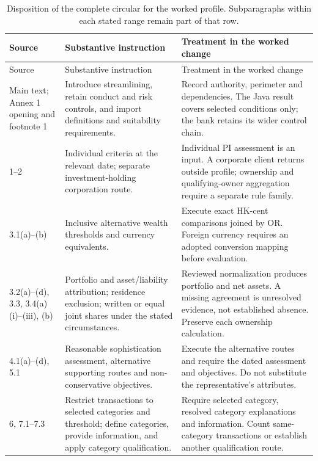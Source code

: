 
\begingroup\small
\begin{longtable}{P{0.14\textwidth}P{0.37\textwidth}P{0.39\textwidth}}
\caption{Disposition of the complete circular for the worked profile. Subparagraphs
within each stated range remain part of that row.}\label{tab:circular-inventory}\\
\toprule Source & Substantive instruction & Treatment in the worked change \\\midrule
\endfirsthead
\toprule Source & Substantive instruction & Treatment in the worked change \\\midrule
\endhead
Main text; Annex 1 opening and footnote 1 & Introduce streamlining, retain conduct and risk controls, and import definitions and suitability requirements. & Record authority, perimeter and dependencies. The Java result covers selected conditions only; the bank retains its wider control chain.\\
1--2 & Individual criteria at the relevant date; separate investment-holding corporation route. & Individual PI assessment is an input. A corporate client returns outside profile; ownership and qualifying-owner aggregation require a separate rule family.\\
3.1(a)--(b) & Inclusive alternative wealth thresholds and currency equivalents. & Execute exact HK-cent comparisons joined by OR. Foreign currency requires an adopted conversion mapping before evaluation.\\
3.2(a)--(d), 3.3, 3.4(a)(i)--(iii), (b) & Portfolio and asset/liability attribution; residence exclusion; written or equal joint shares under the stated circumstances. & Reviewed normalization produces portfolio and net assets. A missing agreement is unresolved evidence, not established absence. Preserve each ownership calculation.\\
4.1(a)--(d), 5.1 & Reasonable sophistication assessment, alternative supporting routes and non-conservative objectives. & Execute the alternative routes and require the dated assessment and objectives. Do not substitute the representative's attributes.\\
6, 7.1--7.3 & Restrict transactions to selected categories and threshold; define categories, provide information, and apply category qualification. & Require selected category, resolved category explanations and information. Count same-category transactions or establish another qualification route.\\

\end{longtable}
